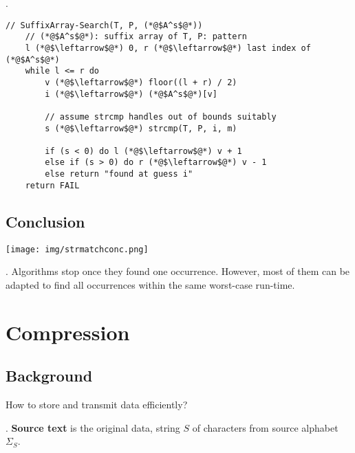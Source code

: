\documentclass{article}
\begin{document}
\begin{codes}[].
    \begin{lstlisting}[style=cppstyle]
    // SuffixArray-Search(T, P, (*@$A^s$@*))
    // (*@$A^s$@*): suffix array of T, P: pattern
    l (*@$\leftarrow$@*) 0, r (*@$\leftarrow$@*) last index of (*@$A^s$@*)
    while l <= r do
        v (*@$\leftarrow$@*) floor((l + r) / 2)
        i (*@$\leftarrow$@*) (*@$A^s$@*)[v]
    
        // assume strcmp handles out of bounds suitably
        s (*@$\leftarrow$@*) strcmp(T, P, i, m)
    
        if (s < 0) do l (*@$\leftarrow$@*) v + 1
        else if (s > 0) do r (*@$\leftarrow$@*) v - 1
        else return "found at guess i"
    return FAIL
    \end{lstlisting}
\end{codes}

\subsection{Conclusion} 

\begin{center}
    \texttt{[image: img/strmatchconc.png]}
\end{center}

\begin{comm}[].
    Algorithms stop once they found one occurrence. However, most of them can be adapted to find all occurrences within the same  worst-case run-time. 
\end{comm}

\newpage

\section{Compression} 

\subsection{Background} 

\begin{Question}{}
    How to store and transmit data efficiently? 
\end{Question}

\begin{deff}.
    \textbf{Source text} is the original data, string $S$ of characters from  source alphabet $\Sigma_S$. 
\end{deff}
\end{document}
